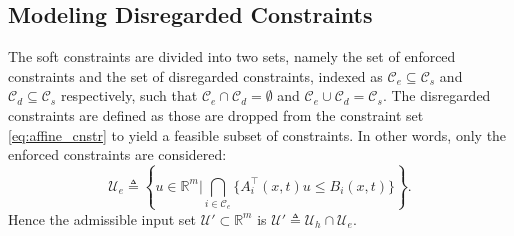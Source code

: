\documentclass[letterpaper, 10 pt, conference]{ieeeconf}  %
\newtheorem{definition}{\textbf{Definition}}
\begin{document}
\subsection{Modeling Disregarded Constraints}

{
\par 
{\color{blue}
The soft constraints are divided into two sets, namely the set of enforced constraints and the set of disregarded constraints, indexed as $\mathcal{C}_e \subseteq \mathcal{C}_s$ and $\mathcal{C}_d \subseteq \mathcal{C}_s$ respectively, such that $\mathcal{C}_e \cap \mathcal{C}_d = \emptyset$ and $\mathcal{C}_e \cup \mathcal{C}_d = \mathcal{C}_s$. The disregarded constraints are defined as those are dropped from the constraint set \eqref{eq:affine_cnstr} to yield a feasible subset of constraints. In other words, only the enforced constraints are considered:
\begin{equation}
    \mathcal{U}_e \triangleq \left\{ u \in \mathbb{R}^m | \bigcap_{i \in \mathcal{C}_e} \{A_i^\top(x,t)u \leq B_i(x,t)\} \right\} .
\end{equation}
Hence the admissible input set $\mathcal{U}'\subset \mathbb{R}^m$ is $\mathcal{U}'\triangleq \mathcal{U}_h \cap \mathcal{U}_e$.
}



}
\end{document}
